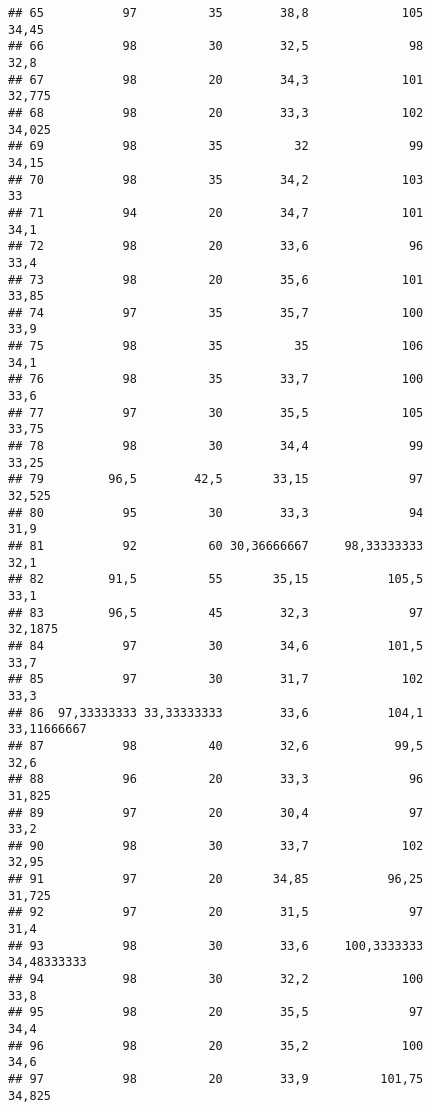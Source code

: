 \documentclass[
]{article}
\begin{document}
\begin{verbatim}
## 65           97          35        38,8             105                34,45
## 66           98          30        32,5              98                 32,8
## 67           98          20        34,3             101               32,775
## 68           98          20        33,3             102               34,025
## 69           98          35          32              99                34,15
## 70           98          35        34,2             103                   33
## 71           94          20        34,7             101                 34,1
## 72           98          20        33,6              96                 33,4
## 73           98          20        35,6             101                33,85
## 74           97          35        35,7             100                 33,9
## 75           98          35          35             106                 34,1
## 76           98          35        33,7             100                 33,6
## 77           97          30        35,5             105                33,75
## 78           98          30        34,4              99                33,25
## 79         96,5        42,5       33,15              97               32,525
## 80           95          30        33,3              94                 31,9
## 81           92          60 30,36666667     98,33333333                 32,1
## 82         91,5          55       35,15           105,5                 33,1
## 83         96,5          45        32,3              97              32,1875
## 84           97          30        34,6           101,5                 33,7
## 85           97          30        31,7             102                 33,3
## 86  97,33333333 33,33333333        33,6           104,1          33,11666667
## 87           98          40        32,6            99,5                 32,6
## 88           96          20        33,3              96               31,825
## 89           97          20        30,4              97                 33,2
## 90           98          30        33,7             102                32,95
## 91           97          20       34,85           96,25               31,725
## 92           97          20        31,5              97                 31,4
## 93           98          30        33,6     100,3333333          34,48333333
## 94           98          30        32,2             100                 33,8
## 95           98          20        35,5              97                 34,4
## 96           98          20        35,2             100                 34,6
## 97           98          20        33,9          101,75               34,825

\end{verbatim}
\end{document}
